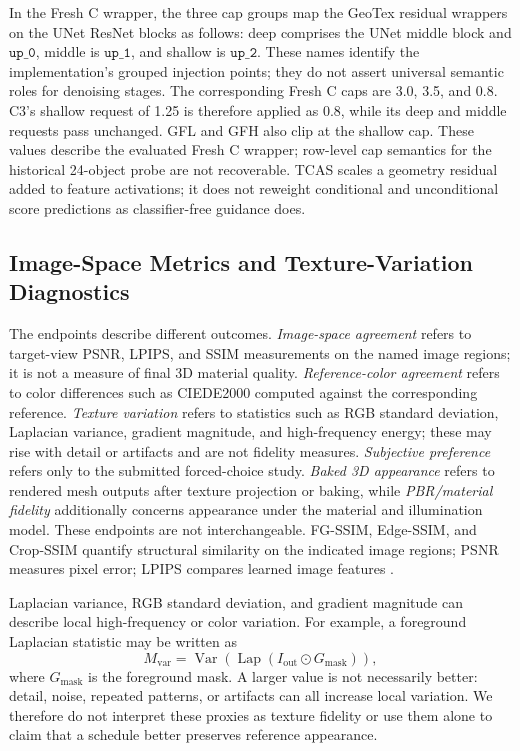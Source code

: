 \documentclass[times,twocolumn,final]{elsarticle}
\begin{document}
In the Fresh C wrapper, the three cap groups map the GeoTex residual wrappers on the UNet ResNet blocks as follows: deep comprises the UNet middle block and $\texttt{up\_0}$, middle is $\texttt{up\_1}$, and shallow is $\texttt{up\_2}$. These names identify the implementation's grouped injection points; they do not assert universal semantic roles for denoising stages. The corresponding Fresh C caps are 3.0, 3.5, and 0.8. C3's shallow request of 1.25 is therefore applied as 0.8, while its deep and middle requests pass unchanged. GFL and GFH also clip at the shallow cap. These values describe the evaluated Fresh C wrapper; row-level cap semantics for the historical 24-object probe are not recoverable. TCAS scales a geometry residual added to feature activations; it does not reweight conditional and unconditional score predictions as classifier-free guidance does.

\subsection{Image-Space Metrics and Texture-Variation Diagnostics}
\label{subsec:metrics}

The endpoints describe different outcomes. \emph{Image-space agreement} refers to target-view PSNR, LPIPS, and SSIM measurements on the named image regions; it is not a measure of final 3D material quality. \emph{Reference-color agreement} refers to color differences such as CIEDE2000 computed against the corresponding reference. \emph{Texture variation} refers to statistics such as RGB standard deviation, Laplacian variance, gradient magnitude, and high-frequency energy; these may rise with detail or artifacts and are not fidelity measures. \emph{Subjective preference} refers only to the submitted forced-choice study. \emph{Baked 3D appearance} refers to rendered mesh outputs after texture projection or baking, while \emph{PBR/material fidelity} additionally concerns appearance under the material and illumination model. These endpoints are not interchangeable. FG-SSIM, Edge-SSIM, and Crop-SSIM quantify structural similarity on the indicated image regions; PSNR measures pixel error; LPIPS compares learned image features \cite{wang2004ssim,zhang2018lpips}.

Laplacian variance, RGB standard deviation, and gradient magnitude can describe local high-frequency or color variation. For example, a foreground Laplacian statistic may be written as
\begin{equation}
M_{\mathrm{var}}=\operatorname{Var}\!\left(\operatorname{Lap}(I_{\mathrm{out}}\odot G_{\mathrm{mask}})\right),
\end{equation}
where $G_{\mathrm{mask}}$ is the foreground mask. A larger value is not necessarily better: detail, noise, repeated patterns, or artifacts can all increase local variation. We therefore do not interpret these proxies as texture fidelity or use them alone to claim that a schedule better preserves reference appearance.
\end{document}

